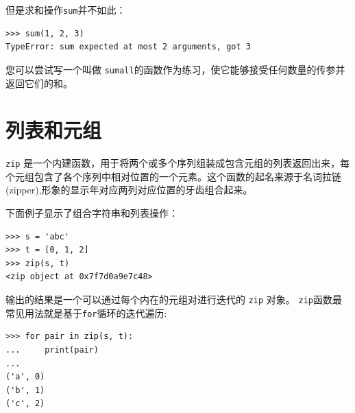 %

但是求和操作\lstinline{sum}并不如此：
 

\begin{lstlisting}
>>> sum(1, 2, 3)
TypeError: sum expected at most 2 arguments, got 3
\end{lstlisting}

%

您可以尝试写一个叫做 \lstinline{sumall}的函数作为练习，使它能够接受任何数量的传参并返回它们的和。

\section{列表和元组}
 


\lstinline{zip} 是一个内建函数，用于将两个或多个序列组装成包含元组的列表返回出来，每个元组包含了各个序列中相对位置的一个元素。这个函数的起名来源于名词拉链(zipper),形象的显示年对应两列对应位置的牙齿组合起来。


下面例子显示了组合字符串和列表操作：

\begin{lstlisting}
>>> s = 'abc'
>>> t = [0, 1, 2]
>>> zip(s, t)
<zip object at 0x7f7d0a9e7c48>
\end{lstlisting}

%

输出的结果是一个可以通过每个内在的元组对进行迭代的 \lstinline{zip} 对象。 \lstinline{zip}函数最常见用法就是基于\lstinline{for}循环的迭代遍历:

\begin{lstlisting}
>>> for pair in zip(s, t):
...     print(pair)
...
('a', 0)
('b', 1)
('c', 2)
\end{lstlisting}

